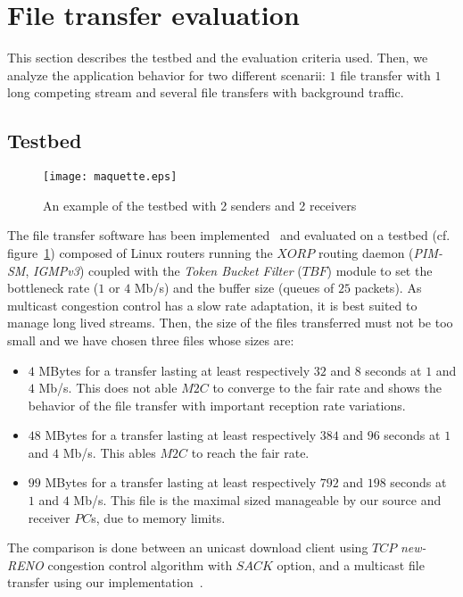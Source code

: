 \documentclass[a4paper]{article}
\begin{document}
\section{File transfer evaluation}
    This section describes the testbed and the evaluation criteria used. Then,
    we analyze the application behavior for two different scenarii:
    $1$ file transfer with $1$ long competing stream and several file transfers
    with background traffic.

    \subsection{Testbed}
        \begin{figure}[t]
            \centering
\texttt{[image: maquette.eps]}
            \caption{An example of the testbed with 2 senders and 2 receivers}
            \label{fig:testbed}
        \end{figure}
        The file transfer software has been implemented~\cite{_mutual:_2009} and
        evaluated on a testbed (cf.  figure~\ref{fig:testbed}) composed of Linux
        routers running the $XORP$ routing daemon (\textit{PIM-SM},
                \textit{IGMPv3}) coupled with the \textit{Token Bucket Filter}
        ($TBF$) module to set the bottleneck rate ($1$ or $4$ Mb/s) and the
        buffer size (queues of $25$ packets).
As multicast congestion control has a slow rate adaptation, it is best
        suited to manage long lived streams. Then, the size of the files
        transferred must not be too small and we have chosen three files whose
        sizes are:
        \begin{itemize}
            \item{
                $4$ MBytes for a transfer lasting at least respectively $32$ and
                    $8$ seconds at $1$ and $4$ Mb/s.  This does not able $M2C$
                    to converge to the fair rate and shows the behavior of the
                    file transfer with important reception rate variations.
            }
            \item{
                $48$ MBytes for a transfer lasting at least respectively $384$
                    and $96$ seconds at $1$ and $4$ Mb/s. This ables $M2C$ to
                    reach the fair rate.
            }
            \item{
                $99$ MBytes for a transfer lasting at least respectively $792$
                    and $198$ seconds at $1$ and $4$ Mb/s.  This file is the
                    maximal sized manageable by our source and receiver $PC$s,
                            due to memory limits.
            }
        \end{itemize}
        The comparison is done between an unicast download client using $TCP$
        \textit{\mbox{new-RENO}} congestion control algorithm with $SACK$
        option, and a multicast file transfer using our
        implementation~\cite{_mutual:_2009}.
\end{document}
